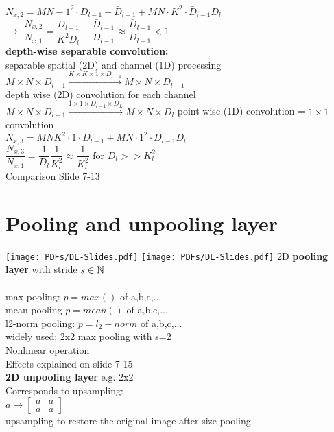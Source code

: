 $ N_{x,2 } = MN- 1^2 \cdot D_{l-1} + \bar{D}_{l-1 } + MN \cdot K^2 \cdot \bar{D}_{l-1} D_l $\\
$ \rightarrow $ $ \dfrac{N_{x,2}}{N_{x,1}} = \dfrac{D_{l-1}}{K^2 D_l} + \dfrac{\bar{D}_{l-1}}{D_{l-1}} \approx \dfrac{\bar{D}_{l-1}}{D_{l-1}} < 1 $\\
\textbf{\textbullet depth-wise separable convolution:}\\
separable spatial (2D) and channel (1D) processing \\
\textbullet $ M \times N \times D_{l-1} \overset{K \times K \times 1 \times D_{l-1} }{\longrightarrow} M \times N \times D_{l-1}  $ \\
depth wise (2D) convolution for each channel \\
\textbullet $  M \times N \times D_{l-1} \overset {1 \times 1 \times D_{l-1} \times D_L}{\longrightarrow} M \times N \times D_l  $ point wise (1D) convolution = $  1 \times 1  $ convolution \\
$  N_{x,3 } = MNK^2 \cdot 1 \cdot D_{l-1 } + MN \cdot 1^2 \cdot D_{l-1 } D_l  $\\
$  \dfrac{N_{x,3}}{N_{x,1} } = \dfrac{1}{D_l } \dfrac{1}{K_l^2} \approx \dfrac{1}{K_l^2}  $ for $  D_l >> K_l ^2 $\\
\textbullet Comparison Slide 7-13
\section{Pooling and unpooling layer}
\texttt{[image: PDFs/DL-Slides.pdf]}
\pagebreak
\texttt{[image: PDFs/DL-Slides.pdf]}
2D \textbf{pooling layer} with  stride $  s \in \mathbb N $\\
\\
\textbullet max pooling: $ p = max() $ of a,b,c,...\\
\textbullet mean pooling $ p= mean () $ of a,b,c,...\\
\textbullet l2-norm pooling: $ p= l_2-norm $ of a,b,c,...\\
widely used; 2x2 max pooling with s=2 \\
Nonlinear operation\\
Effects explained on slide 7-15\\
\textbf{2D unpooling layer} e.g. 2x2 \\
Corresponds to upsampling:\\
$ a \rightarrow \left[ 
\begin{matrix}
	a & a\\
	a & a 
\end{matrix}
\right] $\\
upsampling to restore the original image after size pooling

